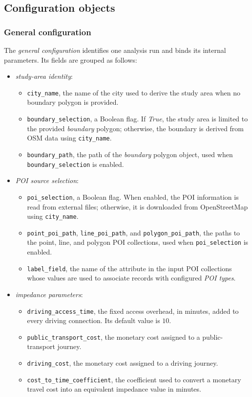 \documentclass{article}
\begin{document}
\subsection{Configuration objects}
\subsubsection*{General configuration}
The \emph{general configuration} identifies one analysis run and binds its internal parameters. Its fields are grouped as follows:
\begin{itemize}
    \item \emph{study-area identity}: 
    \begin{itemize}
        \item \texttt{city\_name}, the name of the city used to derive the study area when no boundary polygon is provided.
        \item \texttt{boundary\_selection}, a Boolean flag. If \emph{True}, the study area is limited to the provided \emph{boundary} polygon; otherwise, the boundary is derived from OSM data using \texttt{city\_name}.
        \item \texttt{boundary\_path}, the path of the \emph{boundary} polygon object, used when \texttt{boundary\_selection} is enabled.
    \end{itemize}

    \item \emph{POI source selection}:
    \begin{itemize}
        \item \texttt{poi\_selection}, a Boolean flag. When enabled, the POI
        information is read from external files; otherwise, it is downloaded from
        OpenStreetMap using \texttt{city\_name}.
        \item \texttt{point\_poi\_path}, \texttt{line\_poi\_path}, and
        \texttt{polygon\_poi\_path}, the paths to the point, line, and polygon POI
        collections, used when \texttt{poi\_selection} is enabled.
        \item \texttt{label\_field}, the name of the attribute in the input POI
        collections whose values are used to associate records with configured
        \emph{POI types}.
    \end{itemize}

    \item \emph{impedance parameters}:
    \begin{itemize}
        \item \texttt{driving\_access\_time}, the fixed access overhead, in minutes,
        added to every driving connection. Its default value is \(10\).
        \item \texttt{public\_transport\_cost}, the monetary cost assigned to a
        public-transport journey.
        \item \texttt{driving\_cost}, the monetary cost assigned to a driving
        journey.
        \item \texttt{cost\_to\_time\_coefficient}, the coefficient used to
        convert a monetary travel cost into an equivalent impedance value in
        minutes.
    \end{itemize}



\end{itemize}
\end{document}
